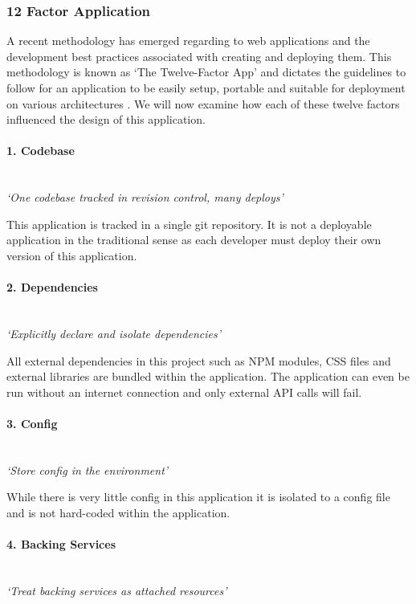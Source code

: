 \subsubsection{12 Factor Application}
A recent methodology has emerged regarding to web applications and the development best practices associated with creating and deploying them. This methodology is known as `The Twelve-Factor App' and dictates the guidelines to follow for an application to be easily setup, portable and suitable for deployment on various architectures \citep{Wiggins2017}. We will now examine how each of these twelve factors influenced the design of this application.

\paragraph{1. Codebase}\mbox{}\\
\textit{`One codebase tracked in revision control, many deploys'}

This application is tracked in a single \gls{git} repository. It is not a deployable application in the traditional sense as each developer must deploy their own version of this application.

\paragraph{2. Dependencies}\mbox{}\\
\textit{`Explicitly declare and isolate dependencies'}

All external dependencies in this project such as NPM modules, \gls{CSS} files and external libraries are bundled within the application. The application can even be run without an internet connection and only external API calls will fail.

\paragraph{3. Config}\mbox{}\\
\textit{`Store config in the environment'}

While there is very little config in this application it is isolated to a config file and is not hard-coded within the application.

\paragraph{4. Backing Services}\mbox{}\\
\textit{`Treat backing services as attached resources'}

